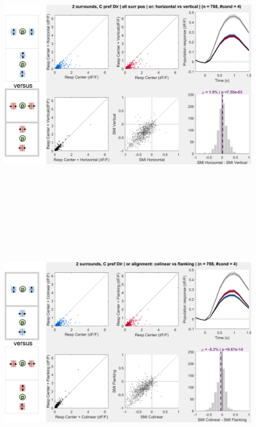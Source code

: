 \begin{figure}[H] \centering \includegraphics[width=11cm,height=11cm,keepaspectratio]{Figures/7.Results/population/sel/diagrams/6.png} 
\end{figure}

\begin{figure}[H] \centering \includegraphics[width=11cm,height=11cm,keepaspectratio]{Figures/7.Results/population/sel/diagrams/7.png} 
\end{figure}


